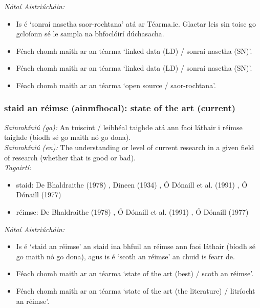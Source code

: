  \noindent \textit{Nótaí Aistriúcháin:}
\begin{itemize}
	\item Is é `sonraí nasctha saor-rochtana' atá ar Téarma.ie. Glactar leis sin toisc go gcloíonn sé le sampla na bhfoclóirí dúchasacha.
	\item Féach chomh maith ar an téarma `linked data (LD) / sonraí nasctha (SN)'.
	\item Féach chomh maith ar an téarma `linked data (LD) / sonraí nasctha (SN)'.
	\item Féach chomh maith ar an téarma `open source / saor-rochtana'.
\end{itemize}


\subsubsection*{staid an réimse (ainmfhocal): state of the art (current)}
 \noindent \textit{Sainmhíniú (ga):} An tuiscint / leibhéal taighde atá ann faoi láthair i réimse taighde (bíodh sé go maith nó go dona).
\\
 \noindent \textit{Sainmhíniú (en):} The understanding or level of current research in a given field of research (whether that is good or bad).
\\
 \noindent \textit{Tagairtí:}
\begin{itemize}
	\item staid: De Bhaldraithe (1978) \cite{de-bhaldraithe}, Dineen (1934) \cite{dineen}, Ó Dónaill et al. (1991) \cite{focloir-beag}, Ó Dónaill (1977) \cite{odonaill}
	\item réimse: De Bhaldraithe (1978) \cite{de-bhaldraithe}, Ó Dónaill et al. (1991) \cite{focloir-beag}, Ó Dónaill (1977) \cite{odonaill}
\end{itemize}

 \noindent \textit{Nótaí Aistriúcháin:}
\begin{itemize}
	\item Is é `staid an réimse' an staid ina bhfuil an réimse ann faoi láthair (bíodh sé go maith nó go dona), agus is é `scoth an réimse' an chuid is fearr de.
	\item Féach chomh maith ar an téarma `state of the art (best) / scoth an réimse'.
	\item Féach chomh maith ar an téarma `state of the art (the literature) / litríocht an réimse'.
\end{itemize}


